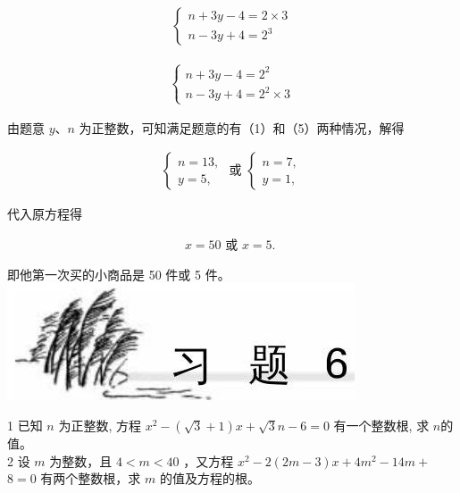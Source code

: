 \documentclass[10pt]{article}
\begin{document}
\begin{align*}
\left\{\begin{array}{l}
n+3 y-4=2 \times 3  \tag{5}\\
n-3 y+4=2^{3}
\end{array}\right.
\end{align*}

\begin{align*}
\left\{\begin{array}{l}
n+3 y-4=2^{2}  \tag{6}\\
n-3 y+4=2^{2} \times 3
\end{array}\right.
\end{align*}

由题意 $y 、 n$ 为正整数，可知满足题意的有（1）和（5）两种情况，解得

\begin{align*}
\left\{\begin{array} { l } 
{ n = 1 3 , } \\
{ y = 5 , }
\end{array} \text { 或 } \left\{\begin{array}{l}
n=7, \\
y=1,
\end{array}\right.\right.
\end{align*}

代入原方程得

\begin{align*}
x=50 \text { 或 } x=5 \text {. }
\end{align*}

即他第一次买的小商品是 50 件或 5 件。\\
\includegraphics[max width=\textwidth, center]{2024_10_30_1bf34f7aeb61f11d11d3g-091}

1 已知 $n$ 为正整数, 方程 $x^{2}-(\sqrt{3}+1) x+\sqrt{3} n-6=0$ 有一个整数根, 求 $n$的值。\\
2 设 $m$ 为整数，且 $4<m<40$ ，又方程 $x^{2}-2(2 m-3) x+4 m^{2}-14 m+$ $8=0$ 有两个整数根，求 $m$ 的值及方程的根。
\end{document}
